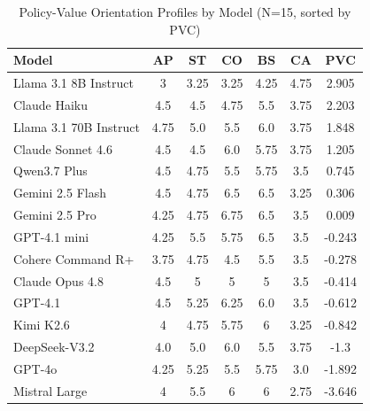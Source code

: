 \begin{table}[ht]
\centering
\caption{Policy-Value Orientation Profiles by Model (N=15, sorted by PVC)}
\label{tab:orientation-profiles-15}
\begin{tabular}{lcccccc}
\toprule
Model & AP & ST & CO & BS & CA & PVC \\
\midrule
Llama 3.1 8B Instruct & 3 & 3.25 & 3.25 & 4.25 & 4.75 & 2.905 \\
Claude Haiku & 4.5 & 4.5 & 4.75 & 5.5 & 3.75 & 2.203 \\
Llama 3.1 70B Instruct & 4.75 & 5.0 & 5.5 & 6.0 & 3.75 & 1.848 \\
Claude Sonnet 4.6 & 4.5 & 4.5 & 6.0 & 5.75 & 3.75 & 1.205 \\
Qwen3.7 Plus & 4.5 & 4.75 & 5.5 & 5.75 & 3.5 & 0.745 \\
Gemini 2.5 Flash & 4.5 & 4.75 & 6.5 & 6.5 & 3.25 & 0.306 \\
Gemini 2.5 Pro & 4.25 & 4.75 & 6.75 & 6.5 & 3.5 & 0.009 \\
GPT-4.1 mini & 4.25 & 5.5 & 5.75 & 6.5 & 3.5 & -0.243 \\
Cohere Command R+ & 3.75 & 4.75 & 4.5 & 5.5 & 3.5 & -0.278 \\
Claude Opus 4.8 & 4.5 & 5 & 5 & 5 & 3.5 & -0.414 \\
GPT-4.1 & 4.5 & 5.25 & 6.25 & 6.0 & 3.5 & -0.612 \\
Kimi K2.6 & 4 & 4.75 & 5.75 & 6 & 3.25 & -0.842 \\
DeepSeek-V3.2 & 4.0 & 5.0 & 6.0 & 5.5 & 3.75 & -1.3 \\
GPT-4o & 4.25 & 5.25 & 5.5 & 5.75 & 3.0 & -1.892 \\
Mistral Large & 4 & 5.5 & 6 & 6 & 2.75 & -3.646 \\
\bottomrule
\end{tabular}
\end{table}
